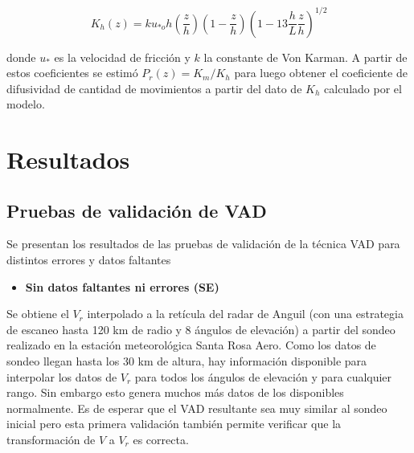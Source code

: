 \documentclass[12pt,spanish,oneside, a4paper]{book}
\providecommand{\tightlist}{%
  \setlength{\itemsep}{0pt}\setlength{\parskip}{0pt}}
\begin{document}
\begin{equation} \label{k-4}
K_h(z) =  ku_{*o}h\left (\frac{z}{h} \right )\left(1-\frac{z}{h} \right)\left (1 - 13\frac{h}{L}\frac{z}{h} \right)^{1/2}
\end{equation}

donde \(u_*\) es la velocidad de fricción y \(k\) la constante de Von
Karman. A partir de estos coeficientes se estimó \(P_r(z) = K_m/K_h\)
para luego obtener el coeficiente de difusividad de cantidad de
movimientos a partir del dato de \(K_h\) calculado por el modelo.

\chapter{Resultados}\label{resultados}

\section{\texorpdfstring{Pruebas de validación de VAD
\label{sec-validacion}}{Pruebas de validación de VAD }}\label{pruebas-de-validacion-de-vad}

Se presentan los resultados de las pruebas de validación de la técnica
VAD para distintos errores y datos faltantes

\begin{itemize}
\tightlist
\item
  \textbf{Sin datos faltantes ni errores (SE)}
\end{itemize}

Se obtiene el \(V_r\) interpolado a la retícula del radar de Anguil (con
una estrategia de escaneo hasta 120 km de radio y 8 ángulos de
elevación) a partir del sondeo realizado en la estación meteorológica
Santa Rosa Aero. Como los datos de sondeo llegan hasta los 30 km de
altura, hay información disponible para interpolar los datos de \(V_r\)
para todos los ángulos de elevación y para cualquier rango. Sin embargo
esto genera muchos más datos de los disponibles normalmente. Es de
esperar que el VAD resultante sea muy similar al sondeo inicial pero
esta primera validación también permite verificar que la transformación
de \(V\) a \(V_r\) es correcta.
\end{document}
